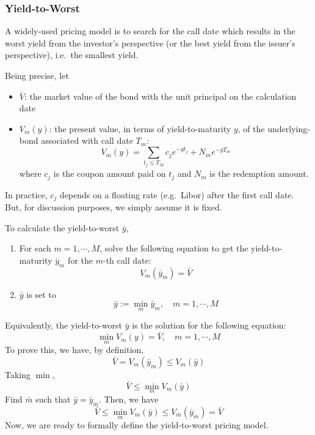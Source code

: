 \documentclass[10pt,a4paper]{article}
\begin{document}
\subsubsection{Yield-to-Worst}
\label{sec:yield-to-worst}

A widely-used pricing model is to search for the call date which results in the worst yield from the investor's perspective (or the best yield from the issuer's perspective), i.e.\ the smallest yield. 

Being precise, let
\begin{itemize}
	\item $\bar{V}$: the market value of the bond with the unit principal on the calculation date
	\item $V_m(y)$: the present value, in terms of yield-to-maturity $y$, of the underlying-bond associated with call date $T_m$: 
	\begin{equation}
	V_m(y) = \sum_{t_j \le T_M} c_j  e^{-yt_j} + N_m e^{-yT_m}
	\label{eqn:valuation-non-callable-bond}
	\end{equation}
	where $c_j$ is the coupon amount paid on $t_j$ and $N_m$ is the redemption amount. 
\end{itemize}
In practice, $c_j$ depends on a floating rate (e.g.\ Libor) after the first call date. But, for discussion purposes, we simply assume it is fixed. 

To calculate the yield-to-worst $\bar{y}$, 
\begin{enumerate}
	\item For each $m = 1, \cdots, M$, solve the following equation to get the yield-to-maturity $\bar{y}_m$ for the $m$-th call date:
	\begin{equation}
	V_m(\bar{y}_m) = \bar{V}
	\end{equation}
	\item $\bar{y}$ is set to
	\begin{equation}
	\bar{y} := \min_m \bar{y}_m, \quad m = 1, \cdots, M
	\end{equation}
\end{enumerate}

Equivalently, the yield-to-worst $\bar{y}$ is the solution for the following equation:
\begin{equation}
\min_{m} V_m(y) = \bar{V}, \quad m = 1, \cdots, M
\end{equation}
To prove this, we have, by definition, 
\begin{equation}
\bar{V} = V_m(\bar{y}_m) \le V_m(\bar{y})
\end{equation}
Taking $\min$, 
\begin{equation}
\bar{V} \le \min_m V_m(\bar{y})
\end{equation}
Find $\bar{m}$ such that $\bar{y} = \bar{y}_{\bar{m}}$. Then, we have
\begin{equation}
\bar{V} \le \min_m V_m(\bar{y}) \le V_{\bar{m}}(\bar{y}_{\bar{m}}) = \bar{V}
\end{equation}
Now, we are ready to formally define the yield-to-worst pricing model. 
\end{document}
